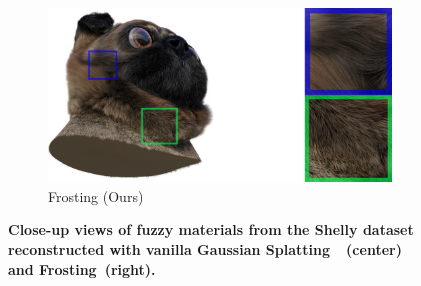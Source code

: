 \begin{figure}[tb]
\begin{subfigure}{0.31\linewidth}
  \includegraphics[width=\linewidth]{images/closeup/pug_rgb_25_detail.png}
  \caption*{Frosting (Ours)}
  \end{subfigure}
  \vspace{-0.3cm}
  \caption{
  \textbf{Close-up views of fuzzy materials from the Shelly dataset~\cite{wang-siggraphasia2023-adaptive-shells} reconstructed with vanilla Gaussian Splatting~\cite{kerbl3Dgaussians}~(center) and Frosting~(right).}
  }
  \label{fig:fuzzy-material-closeup}
\end{figure}